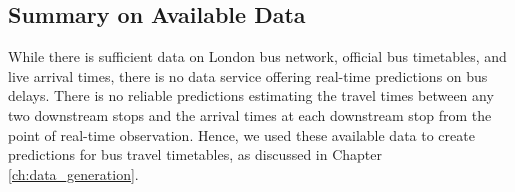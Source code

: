 \subsection{Summary on Available Data}
\par While there is sufficient data on London bus network, official bus timetables, and live arrival times, there is no data service offering real-time predictions on bus delays. There is no reliable predictions estimating the travel times between any two downstream stops and the arrival times at each downstream stop from the point of real-time observation. Hence, we used these available data to create predictions for bus travel timetables, as discussed in Chapter \ref{ch:data_generation}.
